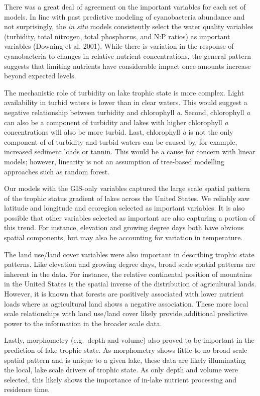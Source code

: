 \documentclass[11pt,]{article}
\begin{document}
There was a great deal of agreement on the important variables for each
set of models. In line with past predictive modeling of cyanobacteria
abundance and not surprisingly, the \emph{in situ} models consistently
select the water quality variables (turbidity, total nitrogen, total
phosphorus, and N:P ratios) as important variables (Downing et al.
2001). While there is variation in the response of cyanobacteria to
changes in relative nutrient concentrations, the general pattern
suggests that limiting nutrients have considerable impact once amounts
increase beyond expected levels.

The mechanistic role of turbidity on lake trophic state is more complex.
Light availability in turbid waters is lower than in clear waters. This
would suggest a negative relationship between turbidity and chlorophyll
\emph{a}. Second, chlorophyll \emph{a} can also be a component of
turbidity and lakes with higher chlorophyll \emph{a} concentrations will
also be more turbid. Last, chlorophyll \emph{a} is not the only
component of of turbidity and turbid waters can be caused by, for
example, increased sediment loads or tannin. This would be a cause for
concern with linear models; however, linearity is not an assumption of
tree-based modelling approaches such as random forest.

Our models with the GIS-only variables captured the large scale spatial
pattern of the trophic status gradient of lakes across the United
States. We reliably saw latitude and longitude and ecoregion selected as
important variables. It is also possible that other variables selected
as important are also capturing a portion of this trend. For instance,
elevation and growing degree days both have obvious spatial components,
but may also be accounting for variation in temperature.

The land use/land cover variables were also important in describing
trophic state patterns. Like elevation and growing degree days, broad
scale spatial patterns are inherent in the data. For instance, the
relative continental position of mountains in the United States is the
spatial inverse of the distribution of agricultural lands. However, it
is known that forests are positively associated with lower nutrient
loads where as agricultural land shows a negative association. These
more local scale relationships with land use/land cover likely provide
additional predictive power to the information in the broader scale
data.

Lastly, morphometry (e.g.~depth and volume) also proved to be important
in the prediction of lake trophic state. As morphometry shows little to
no broad scale spatial pattern and is unique to a given lake, these data
are likely illuminating the local, lake scale drivers of trophic state.
As only depth and volume were selected, this likely shows the importance
of in-lake nutrient processing and residence time.
\end{document}
